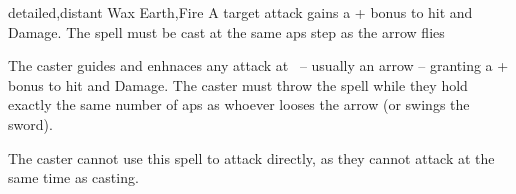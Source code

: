   {detailed,distant}%
  {Wax}%
  {Earth,Fire}%
  {}%
  {A target attack gains a + bonus to hit and Damage. The spell must be cast at the same \glspl{ap} step as the arrow flies}%
  {
    The caster guides and enhnaces any attack at \spellRange\ -- usually an arrow -- granting a + bonus to hit and Damage.
    The caster must throw the spell while they hold exactly the same number of \glspl{ap} as whoever looses the arrow (or swings the sword).

    The caster cannot use this spell to attack directly, as they cannot attack at the same time as casting.
  }
